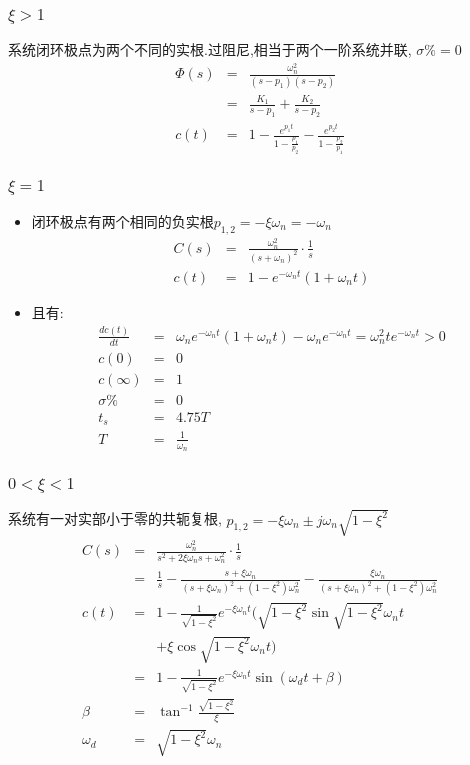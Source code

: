 \documentclass{beamer}
\begin{document}
\begin{frame}
\frametitle{$\xi>1$}
\label{sec-2-3}

   系统闭环极点为两个不同的实根.过阻尼,相当于两个一阶系统并联, $\sigma\%=0$
      \begin{eqnarray*}
      \Phi(s) & = & \frac{\omega_n^2}{(s-p_1)(s-p_2)} \\
              & = & \frac{K_1}{s-p_1}+\frac{K_2}{s-p_2}\\
      c(t)    &=& 1-\frac{e^{p_1 t}}{1-\frac{p_1}{p_2}}-\frac{e^{p_2 t}}{1-\frac{p_2}{p_1}}
      \end{eqnarray*}
\end{frame}
\begin{frame}
\frametitle{$\xi=1$}
\label{sec-2-4}

\begin{itemize}
\item <1-> 闭环极点有两个相同的负实根$p_{1,2}=-\xi\omega_n=-\omega_n$
      \begin{eqnarray*}
      C(s) & = &\frac{\omega_n^2}{(s+\omega_n)^2}\cdot\frac{1}{s} \\
      c(t) &=& 1-e^{-\omega_n t}(1+\omega_n t)
      \end{eqnarray*}
\item <2-> 且有:
      \begin{eqnarray*}
      \frac{dc(t)}{dt} &=& \omega_ne^{-\omega_n t}(1+\omega_n t)-\omega_n e^{-\omega_n t}
       =  \omega_n^2 te^{-\omega_n t} 
       >  0 \\
      c(0) &=&0 \\
      c(\infty)&=&1\\
      \sigma \% &=& 0\\
      t_s &=& 4.75T \\
      T &=&\frac{1}{\omega_n}
      \end{eqnarray*}
\end{itemize}
\end{frame}
\begin{frame}
\frametitle{$0<\xi<1$}
\label{sec-2-5}

   系统有一对实部小于零的共轭复根, $p_{1,2}  =  -\xi\omega_n\pm j\omega_n\sqrt{1-\xi^2}$
\begin{eqnarray*}
C(s) &=& \frac{\omega_n^2}{s^2+2\xi\omega_n s+\omega_n^2}\cdot\frac{1}{s} \\
     &=& \frac{1}{s}-\frac{s+\xi\omega_n}{(s+\xi\omega_n)^2+(1-\xi^2)\omega_n^2}-\frac{\xi\omega_n}{(s+\xi\omega_n)^2+(1-\xi^2)\omega_n^2} \\
c(t) &=& 1-\frac{1}{\sqrt{1-\xi^2}}e^{-\xi\omega_n t}(\sqrt{1-\xi^2}\sin\sqrt{1-\xi^2}\omega_n t \\
     & &+\xi\cos\sqrt{1-\xi^2}\omega_n t)\\
     &=& 1-\frac{1}{\sqrt{1-\xi^2}}e^{-\xi\omega_n t}\sin(\omega_d t+\beta)\\
\beta & = & \tan^{-1}\frac{\sqrt{1-\xi^2}}{\xi} \\
\omega_d &=& \sqrt{1-\xi^2}\omega_n
\end{eqnarray*}
\end{frame}
\end{document}
